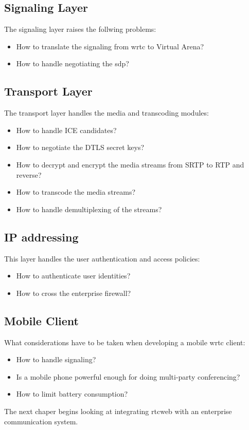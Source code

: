 \subsection{Signaling Layer}
The signaling layer raises the follwing problems:
\begin{itemize}
\item{How to translate the signaling from \gls{wrtc} to Virtual Arena?}
\item{How to handle negotiating the \gls{sdp}?}
\end{itemize}

\subsection{Transport Layer}
The transport layer handles the media and transcoding modules:
\begin{itemize}
\item{How to handle ICE candidates?}
\item{How to negotiate the DTLS secret keys?}
\item{How to decrypt and encrypt the media streams from SRTP to RTP and reverse?}
\item{How to transcode the media streams?}
\item{How to handle demultiplexing of the streams?}
\end{itemize}

\subsection{IP addressing}
This layer handles the user authentication and access policies:
\begin{itemize}
\item{How to authenticate user identities?}
\item{How to cross the enterprise firewall?}
\end{itemize}

\subsection{Mobile Client}
What considerations have to be taken when developing a mobile \gls{wrtc} client:
\begin{itemize}
\item{How to handle signaling?}
\item{Is a mobile phone powerful enough for doing multi-party conferencing?}
\item{How to limit battery consumption?}
\end{itemize}

The next chaper begins looking at integrating \gls{rtcweb} with an enterprise communication system.